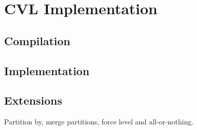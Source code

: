 \section{CVL Implementation}
\label{sec:implementation}

\subsection{Compilation}

\subsection{Implementation}

\subsection{Extensions}

Partition by, merge partitions, force level and all-or-nothing.
